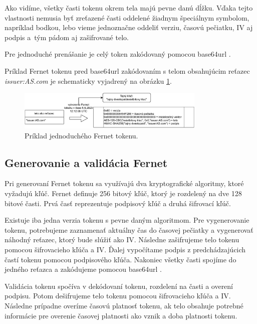 Ako vidíme, všetky časti tokenu okrem tela majú pevne danú dĺžku. Vďaka tejto vlastnosti nemusia byť zreťazené časti oddelené žiadnym špeciálnym symbolom, napríklad bodkou, lebo vieme jednoznačne oddeliť verziu, časovú pečiatku, IV aj podpis a~tým pádom aj zašifrované telo.

Pre jednoduché prenášanie je celý token zakódovaný pomocou base64url \cite{base64_rfc}.

Príklad Fernet tokenu pred base64url zakódovaním s telom obsahujúcim reťazec \textit{issuer:AS.com} je schematicky vyjadrený na obrázku \ref{fig:fernet_token}.

\begin{figure}
    \centerline{\includegraphics[width=0.8\textwidth]{images/fernet_token}}
    \caption[Fernet token]{Príklad jednoduchého Fernet tokenu.}
    \label{fig:fernet_token}
\end{figure}

\subsection{Generovanie a validácia Fernet}

Pri generovaní Fernet tokenu sa využívajú dva kryptografické algoritmy, ktoré vyžadujú kľúč. Fernet definuje 256 bitový kľúč, ktorý je rozdelený na dve 128 bitové časti. Prvá časť reprezentuje podpisový kľúč a druhá šifrovací kľúč.

Existuje iba jedna verzia tokenu s pevne daným algoritmom. Pre vygenerovanie tokenu, potrebujeme zaznamenať aktuálny čas do časovej pečiatky a vygenerovať náhodný reťazec, ktorý bude slúžiť ako IV. Následne zašifrujeme telo tokenu pomocou šifrovacieho kľúča a IV. Ďalej vypočítame podpis z predchádzajúcich častí tokenu pomocou podpisového kľúča. Nakoniec všetky časti spojíme do jedného reťazca a zakódujeme pomocou base64url \cite{base64_rfc}.

Validácia tokenu spočíva v dekódovaní tokenu, rozdelení na časti a overení podpisu. Potom dešifrujeme telo tokenu pomocou šifrovacieho kľúča a IV. Následne prípadne overíme časovú platnosť tokenu, ak telo obsahuje potrebné informácie pre overenie časovej platnosti ako vznik a doba platnosti tokenu.


